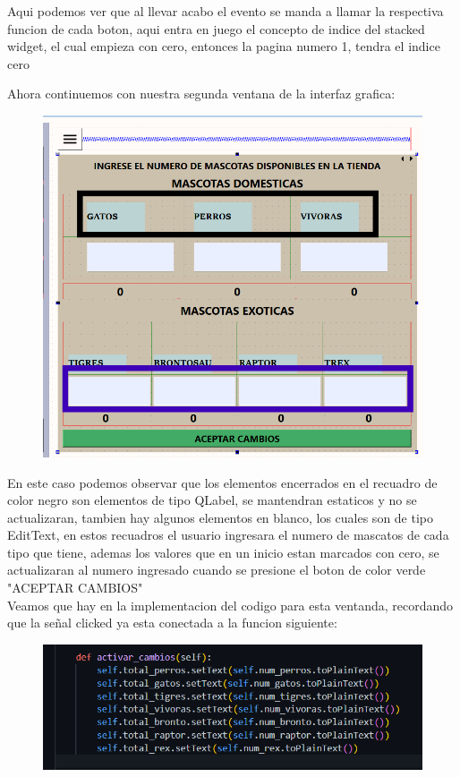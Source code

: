 \documentclass[11pt]{article}
\begin{document}
Aqui podemos ver que al llevar acabo el evento se manda a llamar la respectiva funcion  de cada boton, aqui entra en juego el concepto de indice del stacked widget, el cual empieza con cero, entonces la pagina numero 1, tendra el indice cero

Ahora continuemos con nuestra segunda ventana de la interfaz grafica:
\begin{figure}[H]
		\begin{center}
 			\includegraphics[width = .7\textwidth]{02.png}
 			
		\end{center} 
\end{figure}


En este caso podemos observar que los elementos encerrados en el recuadro de color negro son elementos de tipo QLabel, se mantendran estaticos y no se actualizaran, tambien hay algunos elementos en blanco, los cuales son de tipo EditText, en estos recuadros el usuario ingresara el numero de mascatos de cada tipo que tiene, ademas los valores que en un inicio estan marcados con cero, se actualizaran al numero ingresado cuando se presione  el boton de color verde  "ACEPTAR CAMBIOS"\\
Veamos que hay en la implementacion del codigo para esta ventanda, recordando que la señal clicked ya esta conectada a la funcion siguiente: 
\begin{figure}[H]
		\begin{center}
 			\includegraphics[width = .7\textwidth]{09.png}
 			
		\end{center} 
\end{figure}
\end{document}
